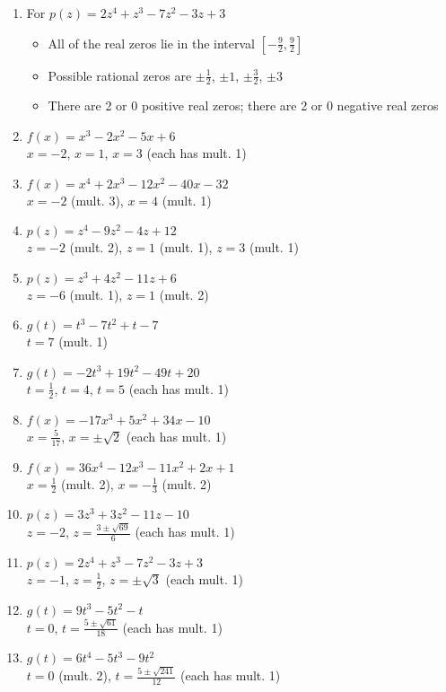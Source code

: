 \documentclass{ximera}
\begin{document}
\begin{enumerate}
\item For   $p(z) = 2z^4+z^3-7z^2-3z+3$
\begin{itemize}
\item  All of the real zeros lie in the interval $\left[-\frac{9}{2},\frac{9}{2}\right]$
\item  Possible rational zeros are  $\pm \frac{1}{2}$, $\pm 1$,  $\pm \frac{3}{2}$, $\pm 3$
\item  There are 2 or 0 positive real zeros;  there are 2 or 0 negative real zeros
\end{itemize}


\item $f(x) = x^{3} - 2x^{2} - 5x + 6$ \\ $x = -2$, $x = 1$, $x = 3$ (each has mult. 1)
\item $f(x) = x^{4} + 2x^{3} - 12x^{2} - 40x - 32$ \\ $x = -2$ (mult. 3), $x = 4$ (mult. 1)


\item $p(z) = z^{4} - 9z^{2} - 4z + 12$ \\ $z = -2$ (mult. 2), $z = 1$ (mult. 1), $z = 3$ (mult. 1)
\item $p(z) = z^{3} + 4z^{2} - 11z + 6$ \\ $z = -6$ (mult. 1), $z = 1$ (mult. 2)

\item $g(t) = t^{3} - 7t^{2} + t - 7$ \\ $t = 7$ (mult. 1)
\item $g(t) = -2t^{3} + 19t^{2} - 49t + 20$ \\ $t = \frac{1}{2}$, $t = 4$, $t = 5$ (each has mult. 1)

\item $f(x) = -17x^{3} + 5x^{2} + 34x - 10$ \\ $x = \frac{5}{17}$, $x = \pm \sqrt{2}$ (each has mult. 1)
\item $f(x) = 36x^{4} - 12x^{3} - 11x^{2} + 2x + 1$ \\ $x = \frac{1}{2}$ (mult. 2), $x = -\frac{1}{3}$ (mult. 2)

\item $p(z) = 3z^{3} + 3z^{2} - 11z - 10$ \\ $z = -2$, $z = \frac{3 \pm \sqrt{69}}{6}$ (each has mult. 1)
\item $p(z) = 2z^4+z^3-7z^2-3z+3$ \\ $z = -1$, $z = \frac{1}{2}$, $z=\pm \sqrt{3}$ (each mult. 1)

\item $g(t) = 9t^{3} - 5t^{2} - t$ \\ $t = 0$, $t = \frac{5 \pm \sqrt{61}}{18}$ (each has mult. 1)
\item $g(t) = 6t^{4} - 5t^{3} - 9t^{2}$ \\ $t = 0$ (mult. 2), $t = \frac{5 \pm \sqrt{241}}{12}$ (each has mult. 1)


\end{enumerate}
\end{document}
